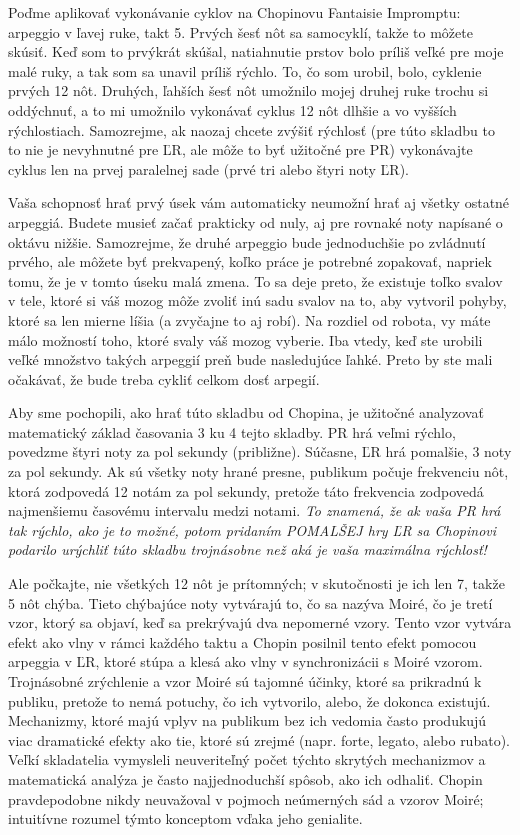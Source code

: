 Poďme aplikovať vykonávanie cyklov na Chopinovu Fantaisie Impromptu: arpeggio v ľavej ruke, takt 5. Prvých šesť nôt sa samocyklí, takže to môžete skúsiť. Keď som to prvýkrát skúšal, natiahnutie prstov bolo príliš veľké pre moje malé ruky, a tak som sa unavil príliš rýchlo. To, čo som urobil, bolo, cyklenie prvých 12 nôt. Druhých, ľahších šesť nôt umožnilo mojej druhej ruke trochu si oddýchnuť, a to mi umožnilo vykonávať cyklus 12 nôt dlhšie a vo vyšších rýchlostiach. Samozrejme, ak naozaj chcete zvýšiť rýchlosť (pre túto skladbu to to nie je nevyhnutné pre ĽR, ale môže to byť užitočné pre PR) vykonávajte cyklus len na prvej paralelnej sade (prvé tri alebo štyri noty ĽR).

Vaša schopnosť hrať prvý úsek vám automaticky neumožní hrať aj všetky ostatné arpeggiá. Budete musieť začať prakticky od nuly, aj pre rovnaké noty napísané o oktávu nižšie. Samozrejme, že druhé arpeggio bude jednoduchšie po zvládnutí prvého, ale môžete byť prekvapený, koľko práce je potrebné zopakovať, napriek tomu, že je v tomto úseku malá zmena. To sa deje preto, že existuje toľko svalov v tele, ktoré si váš mozog môže zvoliť inú sadu svalov na to, aby vytvoril pohyby, ktoré sa len mierne líšia (a zvyčajne to aj robí). Na rozdiel od robota, vy máte málo možností toho, ktoré svaly váš mozog vyberie. Iba vtedy, keď ste urobili veľké množstvo takých arpeggií preň bude nasledujúce ľahké. Preto by ste mali očakávať, že bude treba cykliť celkom dosť arpegií.

Aby sme pochopili, ako hrať túto skladbu od Chopina, je užitočné analyzovať matematický základ časovania 3 ku 4 tejto skladby. PR hrá veľmi rýchlo, povedzme štyri noty za pol sekundy (približne). Súčasne, ĽR hrá pomalšie, 3 noty za pol sekundy. Ak sú všetky noty hrané presne, publikum počuje frekvenciu nôt, ktorá zodpovedá 12 notám za pol sekundy, pretože táto frekvencia zodpovedá najmenšiemu časovému intervalu medzi notami. \emph{To znamená, že ak vaša PR hrá tak rýchlo, ako je to možné, potom pridaním POMALŠEJ hry ĽR sa Chopinovi podarilo urýchliť túto skladbu trojnásobne než aká je vaša maximálna rýchlosť!}

Ale počkajte, nie všetkých 12 nôt je prítomných; v skutočnosti je ich len 7, takže 5 nôt chýba. Tieto chýbajúce noty vytvárajú to, čo sa nazýva Moiré, čo je tretí vzor, ktorý sa objaví, keď sa prekrývajú dva nepomerné vzory. Tento vzor vytvára efekt ako vlny v rámci každého taktu a Chopin posilnil tento efekt pomocou arpeggia v ĽR, ktoré stúpa a klesá ako vlny v synchronizácii s Moiré vzorom. Trojnásobné zrýchlenie a vzor Moiré sú tajomné účinky, ktoré sa prikradnú k publiku, pretože to nemá potuchy, čo ich vytvorilo, alebo, že dokonca existujú. Mechanizmy, ktoré majú vplyv na publikum bez ich vedomia často produkujú viac dramatické efekty ako tie, ktoré sú zrejmé (napr. forte, legato, alebo rubato). Veľkí skladatelia vymysleli neuveriteľný počet týchto skrytých mechanizmov a matematická analýza je často najjednoduchší spôsob, ako ich odhaliť. Chopin pravdepodobne nikdy neuvažoval v pojmoch neúmerných sád a vzorov Moiré; intuitívne rozumel týmto konceptom vďaka jeho genialite.

